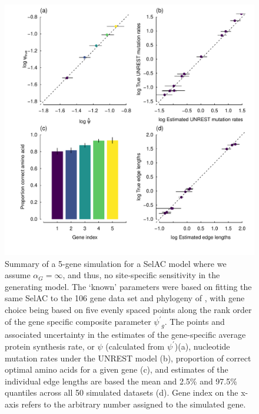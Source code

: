 \documentclass[12pt,letterpaper,fleqn]{article}
\newcommand{\alphag}{\ensuremath{\alpha_G}\xspace}
\newcommand{\psiprime}{\ensuremath{\psi^\prime}\xspace}
\begin{document}
\begin{figure}[H]
  \centering
  \includegraphics[width=0.9\linewidth]{FIGURE_S3_5genes_ALL_UNREST_Selac_NoG.pdf}
  \caption{Summary of a 5-gene simulation for a SelAC model where we assume $\alphag = \infty$, and thus, no site-specific sensitivity in the generating model.
    The `known' parameters were based on fitting the same SelAC to the 106 gene data set and phylogeny of \citet{RokasEtAl2003}, with gene choice being based on five evenly spaced points along the rank order of the gene specific composite parameter $\psiprime_g$.
                The points and associated uncertainty in the estimates of the gene-specific average protein synthesis rate, or $\psi$ (calculated from $\psiprime$)(a), nucleotide mutation rates under the UNREST model (b), proportion of correct optimal amino acids for a given gene (c), and estimates of the individual edge lengths are based the mean and 2.5\% and 97.5\% quantiles across all 50 simulated datasets (d).
                Gene index on the x-axis refers to the arbitrary number assigned to the simulated gene.
}
  \label{fig:SelacNoGSimRes}
\end{figure}
\end{document}
